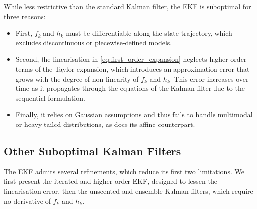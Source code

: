 \begin{algorithm}[!htb]
	\begin{algorithmic}
	\end{algorithmic}\caption{Extended Kalman Filter}\label{alg:EKF}
\end{algorithm}

While less restrictive than the standard Kalman filter, the EKF is suboptimal for three reasons:
\begin{itemize}
	\item First, $f_k$ and $h_k$ must be differentiable along the state trajectory, which excludes discontinuous or piecewise-defined models.
	\item Second, the linearisation in \eqref{eq:first_order_expansion} neglects higher-order terms of the Taylor expansion, which introduces an approximation error that grows with the degree of non-linearity of $f_k$ and $h_k$. This error increases over time as it propagates through the equations of the Kalman filter due to the sequential formulation.
	\item Finally, it relies on Gaussian assumptions and thus fails to handle multimodal or heavy-tailed distributions, as does its affine counterpart.
\end{itemize}

\subsection{Other Suboptimal Kalman Filters}

The EKF admits several refinements, which reduce its first two limitations. We first present the iterated and higher-order EKF, designed to lessen the linearisation error, then the unscented and ensemble Kalman filters, which require no derivative of $f_k$ and $h_k$.

